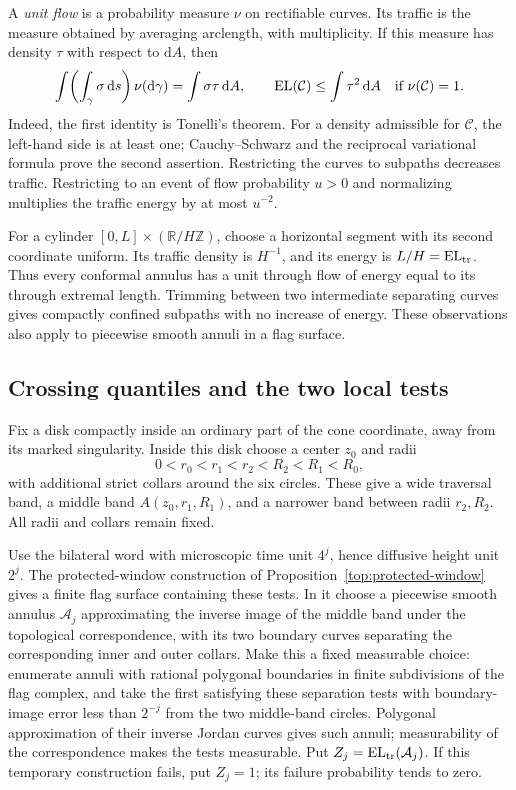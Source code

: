 \documentclass[11pt]{article}
\numberwithin{equation}{section}
\theoremstyle{definition}
\theoremstyle{remark}
\newcommand{\R}{\mathbb R}
\newcommand{\Z}{\mathbb Z}
\newcommand{\dd}{\mathrm d}
\newcommand{\1}{\mathbf 1}
\DeclareMathOperator{\EL}{EL}
\begin{document}
A \emph{unit flow} is a probability measure \(\nu\) on rectifiable
curves.  Its traffic is the measure obtained by averaging arclength,
with multiplicity.  If this measure has density \(\tau\) with respect
to \(\dd A\), then
\begin{equation}
 \int\!\left(\int_\gamma\sigma\,\dd s\right)\nu(\dd\gamma)
   =\int\sigma\tau\,\dd A,
 \qquad
 \EL(\mathcal C)\le\int\tau^2\,\dd A
 \quad\hbox{if }\nu(\mathcal C)=1.
 \label{conf:flow-bound}
\end{equation}
Indeed, the first identity is Tonelli's theorem.  For a density
admissible for \(\mathcal C\), the left-hand side is at least one;
Cauchy--Schwarz and the reciprocal variational formula prove the second
assertion.  Restricting the curves to subpaths decreases traffic.
Restricting to an event of flow probability \(u>0\) and normalizing
multiplies the traffic energy by at most \(u^{-2}\).

For a cylinder \([0,L]\times(\R/H\Z)\), choose a horizontal segment
with its second coordinate uniform.  Its traffic density is \(H^{-1}\),
and its energy is \(L/H=\EL_{\rm tr}\).  Thus every conformal annulus
has a unit through flow of energy equal to its through extremal length.
Trimming between two intermediate separating curves gives compactly
confined subpaths with no increase of energy.  These observations also
apply to piecewise smooth annuli in a flag surface.

\subsection{Crossing quantiles and the two local tests}
\label{conf:quantile-subsection}

Fix a disk compactly inside an ordinary part of the cone coordinate,
away from its marked singularity.  Inside this disk choose a center
\(z_0\) and radii
\[
 0<r_0<r_1<r_2<R_2<R_1<R_0,
\]
with additional strict collars around the six circles.  These give a
wide traversal band, a middle band \(A(z_0,r_1,R_1)\), and a narrower
band between radii \(r_2,R_2\).  All radii and collars remain fixed.

Use the bilateral word with microscopic time unit \(4^j\), hence
diffusive height unit \(2^j\).  The protected-window construction of
Proposition~\ref{top:protected-window} gives a finite flag surface
containing these tests.  In it choose a piecewise smooth annulus
\(\mathcal A_j\) approximating the inverse image of the middle
band under the topological correspondence, with its two boundary curves
separating the corresponding inner and outer collars.  Make this a
fixed measurable choice: enumerate annuli with rational polygonal
boundaries in finite subdivisions of the flag complex, and take the
first satisfying these separation tests with boundary-image error
less than \(2^{-j}\) from the two middle-band circles.  Polygonal
approximation of their inverse Jordan curves gives such annuli;
measurability of the correspondence makes the tests measurable.  Put
\(Z_j=\EL_{\rm tr}(\mathcal A_j)\).  If this temporary construction
fails, put \(Z_j=1\); its failure probability tends to zero.
\end{document}
